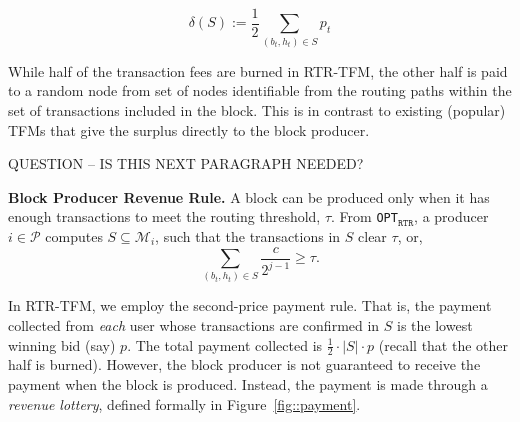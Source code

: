 \documentclass[sigconf,anonymous]{aamas}
\newcommand{\ourTFM}{\textsc{RTR-TFM}}
\newcommand{\ourOPT}{\texttt{OPT$_{\texttt{RTR}}$}}
\begin{document}
\begin{equation}\label{eqn::burn}
    \delta(S) := \frac{1}{2} \sum_{(b_t,h_t)\in S} p_t
\end{equation}

While half of the transaction fees are burned in RTR-TFM, the other half is paid to a random node from set of nodes identifiable from the routing paths within the set of transactions included in the block. This is in contrast to existing (popular) TFMs that give the surplus directly to the block producer.

QUESTION -- IS THIS NEXT PARAGRAPH NEEDED?

\noindent \textbf{Block Producer Revenue Rule. } A block can be produced only when it has enough transactions to meet the routing threshold, $\tau$. From \ourOPT, a producer $i \in \mathcal{P}$ computes $S \subseteq \mathcal{M}_i$, such that the transactions in $S$ clear $\tau$, or,
$$
\sum_{(b_t,h_t) \in S} \frac{c}{2^{j-1}} \geq \tau.
$$

In \ourTFM, we employ the second-price payment rule. That is, the payment collected from \emph{each} user whose transactions are confirmed in $S$ is the lowest winning bid (say) $p$. The total payment collected is $\frac{1}{2}\cdot|S|\cdot p$ (recall that the other half is burned). However, the block producer is not guaranteed to receive the payment when the block is produced. Instead, the payment is made through a \textit{revenue lottery}, defined formally in Figure~\ref{fig::payment}.
\end{document}
